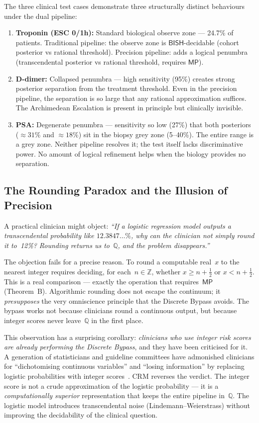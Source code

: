 \documentclass[11pt,a4paper]{article}
\theoremstyle{plain}
\theoremstyle{definition}
\newcommand{\BISH}{\textsf{BISH}}
\newcommand{\MP}{\textsf{MP}}
\newcommand{\Z}{\mathbb{Z}}
\newcommand{\Q}{\mathbb{Q}}
\begin{document}
The three clinical test cases demonstrate three structurally distinct behaviours under the dual pipeline:

\begin{enumerate}[nosep]
\item \textbf{Troponin (ESC 0/1h):} Standard biological observe zone --- 24.7\% of patients.  Traditional pipeline: the observe zone is $\BISH$-decidable (cohort posterior vs rational threshold).  Precision pipeline: adds a logical penumbra (transcendental posterior vs rational threshold, requires $\MP$).
\item \textbf{D-dimer:} Collapsed penumbra --- high sensitivity (95\%) creates strong posterior separation from the treatment threshold.  Even in the precision pipeline, the separation is so large that any rational approximation suffices.  The Archimedean Escalation is present in principle but clinically invisible.
\item \textbf{PSA:} Degenerate penumbra --- sensitivity so low (27\%) that both posteriors ($\approx 31\%$ and $\approx 18\%$) sit in the biopsy grey zone (5--40\%).  The entire range is a grey zone.  Neither pipeline resolves it; the test itself lacks discriminative power.  No amount of logical refinement helps when the biology provides no separation.
\end{enumerate}

\subsection{The Rounding Paradox and the Illusion of Precision}

A practical clinician might object: \emph{``If a logistic regression model outputs a transcendental probability like $12.3847\dots\%$, why can the clinician not simply round it to~12\%?  Rounding returns us to~$\Q$, and the problem disappears.''}

The objection fails for a precise reason.  To round a computable real~$x$ to the nearest integer requires deciding, for each~$n \in \Z$, whether $x \ge n + \tfrac{1}{2}$ or $x < n + \tfrac{1}{2}$.  This is a real comparison --- exactly the operation that requires~$\MP$ (Theorem~B).  Algorithmic rounding does not escape the continuum; it \emph{presupposes} the very omniscience principle that the Discrete Bypass avoids.  The bypass works not because clinicians round a continuous output, but because integer scores never leave~$\Q$ in the first place.

This observation has a surprising corollary: \emph{clinicians who use integer risk scores are already performing the Discrete Bypass}, and they have been criticised for it.  A generation of statisticians and guideline committees have admonished clinicians for ``dichotomising continuous variables'' and ``losing information'' by replacing logistic probabilities with integer scores~\cite{royston2006}.  CRM reverses the verdict.  The integer score is not a crude approximation of the logistic probability --- it is a \emph{computationally superior} representation that keeps the entire pipeline in~$\Q$.  The logistic model introduces transcendental noise (Lindemann--Weierstrass) without improving the decidability of the clinical question.
\end{document}
